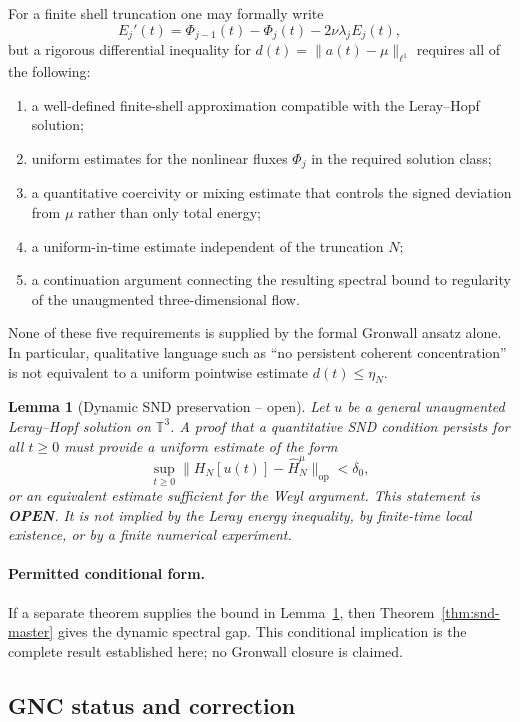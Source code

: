 \documentclass[12pt]{amsart}
\newtheorem{lemma}[theorem]{Lemma}
\theoremstyle{definition}
\newcommand{\HN}{\widehat{H}_N^\mu}
\begin{document}
For a finite shell truncation one may formally write
\[
E_j'(t)=\Phi_{j-1}(t)-\Phi_j(t)-2\nu\lambda_jE_j(t),
\]
but a rigorous differential inequality for
$d(t)=\|a(t)-\mu\|_{\ell^1}$ requires all of the following:
\begin{enumerate}
\item a well-defined finite-shell approximation compatible with the
      Leray--Hopf solution;
\item uniform estimates for the nonlinear fluxes $\Phi_j$ in the
      required solution class;
\item a quantitative coercivity or mixing estimate that controls the
      signed deviation from $\mu$ rather than only total energy;
\item a uniform-in-time estimate independent of the truncation $N$;
\item a continuation argument connecting the resulting spectral bound
      to regularity of the unaugmented three-dimensional flow.
\end{enumerate}
None of these five requirements is supplied by the formal Gronwall
ansatz alone.  In particular, qualitative language such as ``no
persistent coherent concentration'' is not equivalent to a uniform
pointwise estimate $d(t)\le\eta_N$.

\begin{lemma}[Dynamic SND preservation -- open]
\label{lem:dynamic-snd-open}
Let $u$ be a general unaugmented Leray--Hopf solution on $\mathbb T^3$.
A proof that a quantitative SND condition persists for all $t\ge0$
must provide a uniform estimate of the form
\[
\sup_{t\ge0}\|H_N[u(t)]-\HN\|_{\mathrm{op}}<\delta_0,
\]
or an equivalent estimate sufficient for the Weyl argument.  This
statement is \textbf{OPEN}.  It is not implied by the Leray energy
inequality, by finite-time local existence, or by a finite numerical
experiment.
\end{lemma}

\paragraph{Permitted conditional form.}
If a separate theorem supplies the bound in
Lemma~\ref{lem:dynamic-snd-open}, then Theorem~\ref{thm:snd-master}
gives the dynamic spectral gap.  This conditional implication is the
complete result established here; no Gronwall closure is claimed.

\subsection{GNC status and correction}
\end{document}
